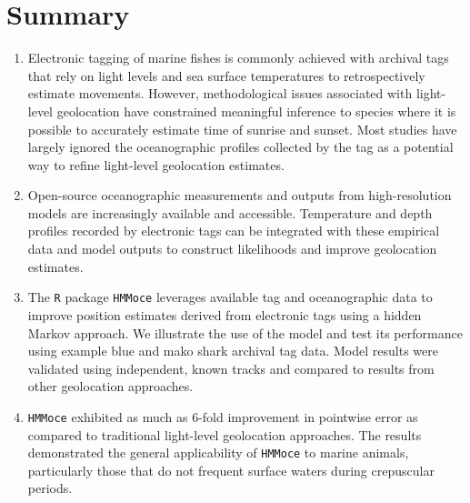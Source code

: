 \section{Summary}\label{summary}

\begin{enumerate}[itemsep=0.1mm]
\def\labelenumi{\arabic{enumi}.}
\item Electronic tagging of marine fishes is commonly achieved with archival tags that rely on light levels and sea surface temperatures to retrospectively estimate movements. However, methodological issues associated with light-level geolocation have constrained meaningful inference to species where it is possible to accurately estimate time of sunrise and sunset. Most studies have largely ignored the oceanographic profiles collected by the tag as a potential way to refine light-level geolocation estimates.

\item Open-source oceanographic measurements and outputs from high-resolution models are increasingly available and accessible. Temperature and depth profiles recorded by electronic tags can be integrated with these empirical data and model outputs to construct likelihoods and improve geolocation estimates.

\item The \texttt{R} package \texttt{HMMoce} leverages available tag and oceanographic data to improve position estimates derived from electronic tags using a hidden Markov approach. We illustrate the use of the model and test its performance using example blue and mako shark archival tag data. Model results were validated using independent, known tracks and compared to results from other geolocation approaches.

\item \texttt{HMMoce} exhibited as much as 6-fold improvement in pointwise error as compared to traditional light-level geolocation approaches. The results demonstrated the general applicability of \texttt{HMMoce} to marine animals, particularly those that do not frequent surface waters during crepuscular periods.
\end{enumerate}
 
